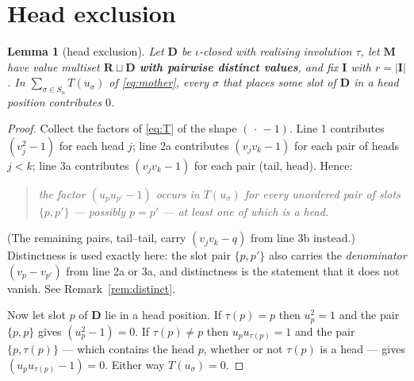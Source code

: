 \documentclass[11pt]{article}
\newtheorem{lem}[thm]{Lemma}
\theoremstyle{definition}
\newcommand{\bM}{\mathbf{M}}
\newcommand{\bI}{\mathbf{I}}
\newcommand{\bD}{\mathbf{D}}
\newcommand{\bR}{\mathbf{R}}
\begin{document}
\section{Head exclusion}
\label{sec:head}

\begin{lem}[head exclusion]\label{lem:head}
Let $\bD$ be $\iota$-closed with realising involution $\tau$, let $\bM$ have value
multiset $\bR\sqcup\bD$ \textbf{with pairwise distinct values}, and fix $\bI$ with
$r=|\bI|$.  In
$\sum_{\sigma\in S_n}T(u_\sigma)$ of \eqref{eq:mother}, every $\sigma$ that places
some slot of $\bD$ in a head position contributes $0$.
\end{lem}

\begin{proof}
Collect the factors of \eqref{eq:T} of the shape $(\,\cdot\,-1)$.  Line 1
contributes $(v_j^2-1)$ for each head $j$; line 2a contributes $(v_jv_k-1)$ for
each pair of heads $j<k$; line 3a contributes $(v_jv_k-1)$ for each pair
(tail, head).  Hence:
\begin{quote}
\emph{the factor $(u_pu_{p'}-1)$ occurs in $T(u_\sigma)$ for every unordered pair
of slots $\{p,p'\}$ --- possibly $p=p'$ --- at least one of which is a head.}
\end{quote}
(The remaining pairs, tail--tail, carry $(v_jv_k-q)$ from line 3b instead.)
Distinctness is used exactly here: the slot pair $\{p,p'\}$ also carries the
\emph{denominator} $(v_p-v_{p'})$ from line 2a or 3a, and distinctness is the
statement that it does not vanish.  See Remark~\ref{rem:distinct}.

Now let slot $p$ of $\bD$ lie in a head position.  If $\tau(p)=p$ then
$u_p^2=1$ and the pair $\{p,p\}$ gives $(u_p^2-1)=0$.  If $\tau(p)\ne p$ then
$u_pu_{\tau(p)}=1$ and the pair $\{p,\tau(p)\}$ --- which contains the head $p$,
whether or not $\tau(p)$ is a head --- gives $(u_pu_{\tau(p)}-1)=0$.  Either way
$T(u_\sigma)=0$.
\end{proof}
\end{document}
